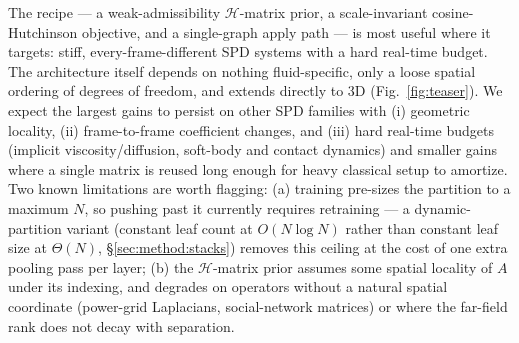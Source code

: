 \documentclass[acmtog,anonymous,review]{acmart}
\theoremstyle{plain}
\begin{document}
The recipe --- a weak-admissibility $\mathcal{H}$-matrix prior, a scale-invariant
cosine-Hutchinson objective, and a single-graph apply path --- is most useful where it
targets: stiff, every-frame-different SPD systems with a hard real-time budget. The
architecture itself depends on nothing fluid-specific, only a loose spatial ordering of
degrees of freedom, and extends directly to 3D (Fig.~\ref{fig:teaser}). We expect the
largest gains to persist on other SPD families with (i) geometric locality, (ii)
frame-to-frame coefficient changes, and (iii) hard real-time budgets (implicit
viscosity/diffusion, soft-body and contact dynamics) and smaller gains where a single
matrix is reused long enough for heavy classical setup to amortize. Two known
limitations are worth flagging: (a) training pre-sizes the partition to a maximum $N$,
so pushing past it currently requires retraining --- a dynamic-partition variant
(constant leaf count at $O(N\log N)$ rather than constant leaf size at $\Theta(N)$,
\S\ref{sec:method:stacks}) removes this ceiling at the cost of one extra pooling pass
per layer; (b) the $\mathcal{H}$-matrix prior assumes some spatial locality of $A$
under its indexing, and degrades on operators without a natural spatial coordinate
(power-grid Laplacians, social-network matrices) or where the far-field rank does not
decay with separation.




\clearpage
\twocolumn

\renewcommand{\topfraction}{0.99}
\renewcommand{\bottomfraction}{0.99}
\renewcommand{\textfraction}{0.0}
\renewcommand{\floatpagefraction}{0.6}
\end{document}
